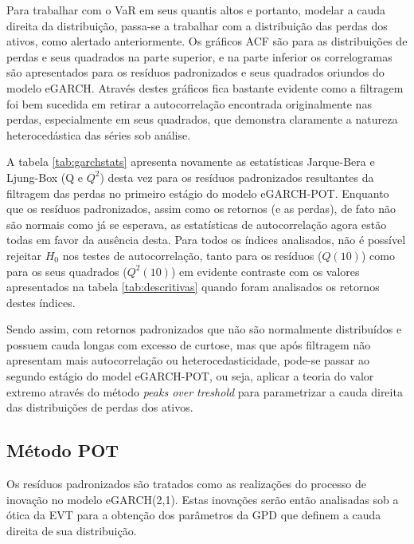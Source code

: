 \documentclass[1p]{elsarticle}
\theoremstyle{definition}
\begin{document}


Para trabalhar com o VaR em seus quantis altos e portanto, modelar a cauda direita da distribuição, passa-se a trabalhar com a distribuição das perdas dos ativos, como alertado anteriormente. Os gráficos ACF são para as distribuições de perdas e seus quadrados na parte superior, e na parte inferior os correlogramas são apresentados para os resíduos padronizados e seus quadrados oriundos do modelo eGARCH. Através destes gráficos fica bastante evidente como a filtragem foi bem sucedida em retirar a autocorrelação encontrada originalmente nas perdas, especialmente em seus quadrados, que demonstra claramente a natureza heterocedástica das séries sob análise. 

A tabela \ref{tab:garchstats} apresenta novamente as estatísticas Jarque-Bera e Ljung-Box (Q e $Q^2$) desta vez para os resíduos padronizados resultantes da filtragem das perdas no primeiro estágio do modelo eGARCH-POT. Enquanto que os resíduos padronizados, assim como os retornos (e as perdas), de fato não são normais como já se esperava, as estatísticas de autocorrelação agora estão todas em favor da ausência desta. Para todos os índices analisados, não é possível rejeitar $H_0$ nos testes de autocorrelação, tanto para os resíduos ($Q(10)$) como para os seus quadrados ($Q^2(10)$) em evidente contraste com os valores apresentados na tabela \ref{tab:descritivas} quando foram analisados os retornos destes índices.




Sendo assim, com retornos padronizados que não são normalmente distribuídos e possuem cauda longas com excesso de curtose, mas que após filtragem não apresentam mais autocorrelação ou heterocedasticidade, pode-se passar ao segundo estágio do model eGARCH-POT, ou seja, aplicar a teoria do valor extremo através do método \emph{peaks over treshold} para parametrizar a cauda direita das distribuições de perdas dos ativos.

\subsection{Método POT}
\label{sec:metpot}

Os resíduos padronizados são tratados como as realizações do processo de inovação no modelo eGARCH(2,1). Estas inovações serão então analisadas sob a ótica da EVT para a obtenção dos parâmetros da GPD que definem a cauda direita de sua distribuição.
\end{document}

